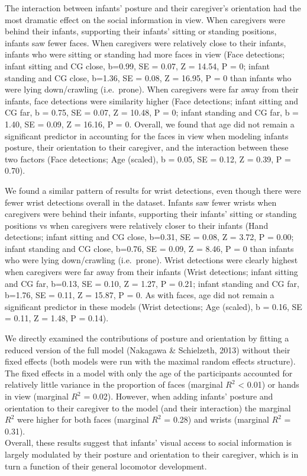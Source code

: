 \documentclass[english,man]{apa6}
\begin{document}
The interaction between infants' posture and their caregiver's
orientation had the most dramatic effect on the social information in
view. When caregivers were behind their infants, supporting their
infants' sitting or standing positions, infants saw fewer faces. When
caregivers were relatively close to their infants, infants who were
sitting or standing had more faces in view (Face detections; infant
sitting and CG close, b=0.99, SE = 0.07, Z = 14.54, P = 0; infant
standing and CG close, b=1.36, SE = 0.08, Z = 16.95, P = 0 than infants
who were lying down/crawling (i.e.~prone). When caregivers were far away
from their infants, face detections were similarity higher (Face
detections; infant sitting and CG far, b = 0.75, SE = 0.07, Z = 10.48, P
= 0; infant standing and CG far, b = 1.40, SE = 0.09, Z = 16.16, P = 0.
Overall, we found that age did not remain a significant predictor in
accounting for the faces in view when modeling infants posture, their
orientation to their caregiver, and the interaction between these two
factors (Face detections; Age (scaled), b = 0.05, SE = 0.12, Z = 0.39, P
= 0.70).

We found a similar pattern of results for wrist detections, even though
there were fewer wrist detections overall in the dataset. Infants saw
fewer wrists when caregivers were behind their infants, supporting their
infants' sitting or standing positions vs when caregivers were
relatively closer to their infants (Hand detections; infant sitting and
CG close, b=0.31, SE = 0.08, Z = 3.72, P = 0.00; infant standing and CG
close, b=0.76, SE = 0.09, Z = 8.46, P = 0 than infants who were lying
down/crawling (i.e.~prone). Wrist detections were clearly highest when
caregivers were far away from their infants (Wrist detections; infant
sitting and CG far, b=0.13, SE = 0.10, Z = 1.27, P = 0.21; infant
standing and CG far, b=1.76, SE = 0.11, Z = 15.87, P = 0. As with faces,
age did not remain a significant predictor in these models (Wrist
detections; Age (scaled), b = 0.16, SE = 0.11, Z = 1.48, P = 0.14).

We directly examined the contributions of posture and orientation by
fitting a reduced version of the full model (Nakagawa \& Schielzeth,
2013) without their fixed effects (both models were run with the maximal
random effects structure). The fixed effects in a model with only the
age of the participants accounted for relatively little variance in the
proportion of faces (marginal \(R^2\) \textless{} 0.01) or hands in view
(marginal \(R^2\) = 0.02). However, when adding infants' posture and
orientation to their caregiver to the model (and their interaction) the
marginal \(R^2\) were higher for both faces (marginal \(R^2\) = 0.28)
and wrists (marginal \(R^2\) = 0.31).\\
Overall, these results suggest that infants' visual access to social
information is largely modulated by their posture and orientation to
their caregiver, which is in turn a function of their general locomotor
development.
\end{document}
